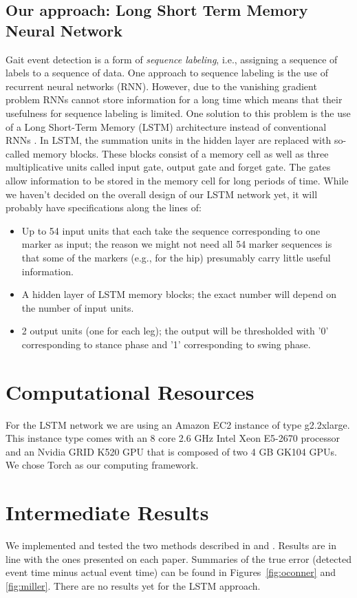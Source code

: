 \documentclass{acm_proc_article-sp}
\begin{document}
\subsection{Our approach: Long Short Term Memory Neural Network}

Gait event detection is a form of \textit{sequence labeling}, i.e., assigning a sequence of labels to a sequence of data.
One approach to sequence labeling is the use of recurrent neural networks (RNN). However, due to the vanishing gradient problem RNNs cannot store information for a long time which means that their usefulness for sequence labeling is limited.
One solution to this problem is the use of a Long Short-Term Memory (LSTM) architecture instead of conventional RNNs \cite{graves_supervised_2012}.
In LSTM, the summation units in the hidden layer are replaced with so-called memory blocks.
These blocks consist of a memory cell as well as three multiplicative units called input gate, output gate and forget gate.
The gates allow information to be stored in the memory cell for long periods of time.
While we haven't decided on the overall design of our LSTM network yet, it will probably have specifications along the lines of:
\begin{itemize}[noitemsep,nolistsep]
\item Up to 54 input units that each take the sequence corresponding to one marker as input; the reason we might not need all 54 marker sequences is that some of the markers (e.g., for the hip) presumably carry little useful information.
\item A hidden layer of LSTM memory blocks; the exact number will depend on the number of input units.
\item 2 output units (one for each leg); the output will be thresholded with '0' corresponding to stance phase and '1' corresponding to swing phase.
\end{itemize}

\section{Computational Resources}

For the LSTM network we are using
an Amazon EC2 instance of type g2.2xlarge.
This instance type comes with an 8 core 2.6 GHz Intel Xeon E5-2670 processor and an Nvidia GRID K520 GPU that is composed of two 4 GB GK104 GPUs.
We chose Torch as our computing framework.

\section{Intermediate Results}
We implemented and tested the two methods described in \cite{oconnor_automatic_2007} and \cite{miller_gait_2009}. Results are in line with the ones presented on each paper. Summaries of the true error (detected event time minus actual event time) can be found in Figures~\ref{fig:oconner} and \ref{fig:miller}.
There are no results yet for the LSTM approach.
\end{document}
